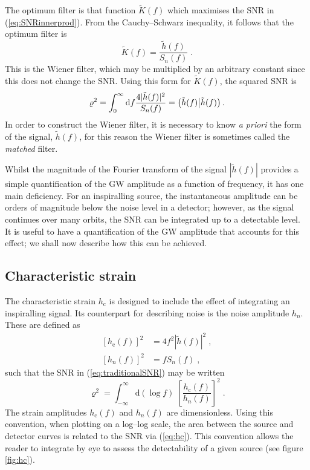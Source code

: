 The optimum filter is that function $\tilde{K}(f)$ which maximises the SNR in (\ref{eq:SNRinnerprod}). From the Cauchy--Schwarz inequality, it follows that the optimum filter is
\begin{equation}
\tilde{K}(f)=\frac{\tilde{h}(f)}{S_{n}(f)} \; .
\end{equation}
This is the Wiener filter, which may be multiplied by an arbitrary constant since this does not change the SNR. Using this form for $\tilde{K}(f)$, the squared SNR is
\begin{equation}
\varrho^2 = \int_0^\infty\mathrm{d}f \frac{4| \tilde{h}(f)|^{2}}{S_n(f)} = \left({\tilde{h}(f)}\middle|{\tilde{h}(f)}\right).
\label{eq:traditionalSNR} 
\end{equation}
In order to construct the Wiener filter, it is necessary to know \emph{a priori} the form of the signal, $\tilde{h}(f)$, for this reason the Wiener filter is sometimes called the \emph{matched} filter.

Whilst the magnitude of the Fourier transform of the signal $|\tilde{h}(f)|$ provides a simple quantification of the GW amplitude as a function of frequency, it has one main deficiency. For an inspiralling source, the instantaneous amplitude can be orders of magnitude below the noise level in a detector; however, as the signal continues over many orbits, the SNR can be integrated up to a detectable level. It is useful to have a quantification of the GW amplitude that accounts for this effect; we shall now describe how this can be achieved.

\subsection{Characteristic strain}\label{sec:character-strain}

The characteristic strain $h_\mathrm{c}$ is designed to include the effect of integrating an inspiralling signal. Its counterpart for describing noise is the noise amplitude $h_n$. These are defined as
\begin{eqnarray}\label{eq:strain-hc} 
\left[h_\mathrm{c}(f)\right]^{2} &= 4f^{2}\left| \tilde{h}(f) \right|^{2} \; ,\\
\left[h_{n}(f)\right]^{2} &= fS_{n}(f) \; ,
\label{eq:strain-hn}
\end{eqnarray}
such that the SNR in (\ref{eq:traditionalSNR}) may be written
\begin{equation}\label{eq:hc} 
\varrho^{2} = \int_{-\infty}^{\infty} \mathrm{d}\left(\log f\right)\; \left[\frac{h_\mathrm{c}(f)}{h_{n}(f)}\right]^{2} \;.
\end{equation}
The strain amplitudes $h_\mathrm{c}(f)$ and $h_{n}(f)$ are dimensionless. Using this convention, when plotting on a log--log scale, the area between the source and detector curves is related to the SNR via (\ref{eq:hc}). This convention allows the reader to integrate by eye to assess the detectability of a given source (see figure \ref{fig:hc}).

